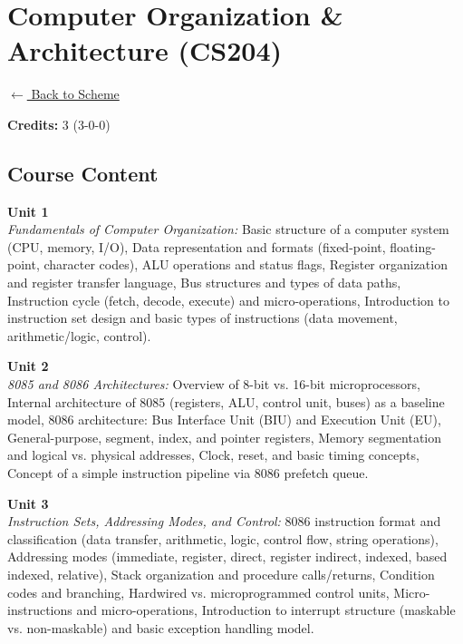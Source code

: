 \section*{Computer Organization \& Architecture (CS204)}
\label{course:CS204}

\noindent \small{\hyperref[main:scheme]{$\leftarrow$ Back to Scheme}} \vspace{0.5cm}

\noindent \textbf{Credits:} 3 (3-0-0)

\subsection*{Course Content}
\noindent\textbf{Unit 1} \\
\textit{Fundamentals of Computer Organization:} Basic structure of a computer system (CPU, memory, I/O), Data representation and formats (fixed-point, floating-point, character codes), ALU operations and status flags, Register organization and register transfer language, Bus structures and types of data paths, Instruction cycle (fetch, decode, execute) and micro-operations, Introduction to instruction set design and basic types of instructions (data movement, arithmetic/logic, control).

\vspace{0.3cm}

\noindent\textbf{Unit 2} \\
\textit{8085 and 8086 Architectures:} Overview of 8-bit vs. 16-bit microprocessors, Internal architecture of 8085 (registers, ALU, control unit, buses) as a baseline model, 8086 architecture: Bus Interface Unit (BIU) and Execution Unit (EU), General-purpose, segment, index, and pointer registers, Memory segmentation and logical vs. physical addresses, Clock, reset, and basic timing concepts, Concept of a simple instruction pipeline via 8086 prefetch queue.

\vspace{0.3cm}

\noindent\textbf{Unit 3} \\
\textit{Instruction Sets, Addressing Modes, and Control:} 8086 instruction format and classification (data transfer, arithmetic, logic, control flow, string operations), Addressing modes (immediate, register, direct, register indirect, indexed, based indexed, relative), Stack organization and procedure calls/returns, Condition codes and branching, Hardwired vs. microprogrammed control units, Micro-instructions and micro-operations, Introduction to interrupt structure (maskable vs. non-maskable) and basic exception handling model.


